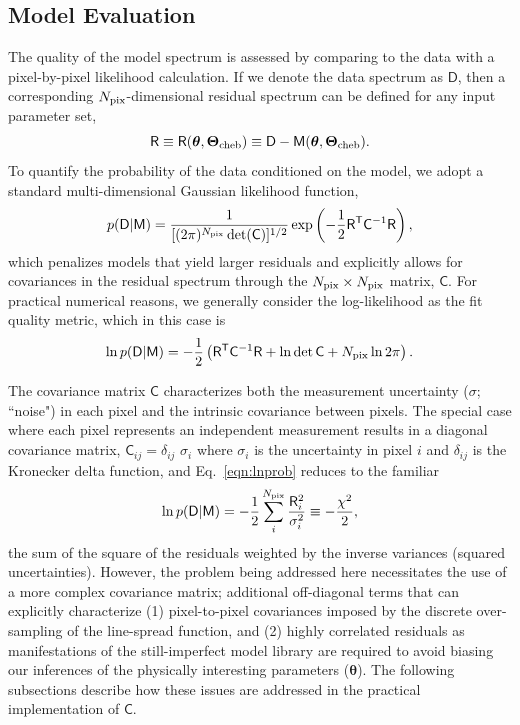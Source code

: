 \documentclass[iop,floatfix]{emulateapj}
\newcommand{\vt}{ {\bm \theta}}
\newcommand{\vT}{ {\bm \Theta}}
\newcommand{\vM}{\mathsf{M}}
\newcommand{\vD}{\mathsf{D}}
\newcommand{\vR}{\mathsf{R}}
\newcommand{\vC}{\mathsf{C}}
\newcommand{\trans}{\mathsf{T}}
\begin{document}
\subsection{Model Evaluation}
\label{subsec:likelihood}

The quality of the model spectrum is assessed by comparing to the data with a pixel-by-pixel 
likelihood calculation.  If we denote the data spectrum as $\vD$, then a corresponding 
$N_{\rm pix}$-dimensional residual spectrum can be defined for any input parameter set,
\begin{equation}
\vR \equiv \vR(\vt, \vT_{\rm cheb}) \equiv \vD-\vM(\vt, \vT_{\rm cheb}).
\end{equation}
To quantify the probability of the data conditioned on the model, we adopt a standard 
multi-dimensional Gaussian likelihood function,
\begin{equation}
p(\vD|\vM) =  \frac{1}{[(2 \pi)^{N_{\rm pix}} \det(\vC)]^{1/2}} \exp\left ( -\frac{1}{2}
   \vR^\trans \vC^{-1} \vR \right ), 
   \label{eqn:prob}
\end{equation}
which penalizes models that yield larger residuals and explicitly allows for covariances in the 
residual spectrum through the $N_{\rm pix} \times N_{\rm pix}$ matrix, $\vC$.  For practical 
numerical reasons, we generally consider the log-likelihood as the fit quality metric, which in 
this case is
\begin{equation}
  \ln{p(\vD | \vM)} = -\frac{1}{2} \left( \vR^\trans \vC^{-1} \vR + \ln{\det{\vC}} + N_{\rm pix} \ln{2\pi} \right).
  \label{eqn:lnprob}
\end{equation}

The covariance matrix $\vC$ characterizes both the measurement uncertainty ($\sigma$; 
``noise") in each pixel and the intrinsic covariance between pixels.  The special case where each 
pixel represents an independent measurement results in a diagonal covariance matrix, $\vC_{ij} = 
\delta_{ij} \,\, \sigma_i$ where $\sigma_i$ is the uncertainty in pixel $i$ and $\delta_{ij}$ is 
the Kronecker delta function, and Eq.~\ref{eqn:lnprob} reduces to the familiar
\begin{equation}
\ln{p(\vD | \vM)} = -\frac{1}{2} \sum_i^{N_{\rm pix}} \frac{\vR_i^2}{\sigma_i^2} \equiv -\frac{\chi^2}{2},
\label{eqn:chisq}
\end{equation}
the sum of the square of the residuals weighted by the inverse variances (squared uncertainties).  
However, the problem being addressed here necessitates the use of a more complex covariance matrix; 
additional off-diagonal terms that can explicitly characterize (1) pixel-to-pixel covariances 
imposed by the discrete over-sampling of the line-spread function, and (2) highly correlated 
residuals as manifestations of the still-imperfect model library are required to avoid biasing our 
inferences of the physically interesting parameters ($\vt$).  The following subsections describe 
how these issues are addressed in the practical implementation of $\vC$.  
\end{document}
